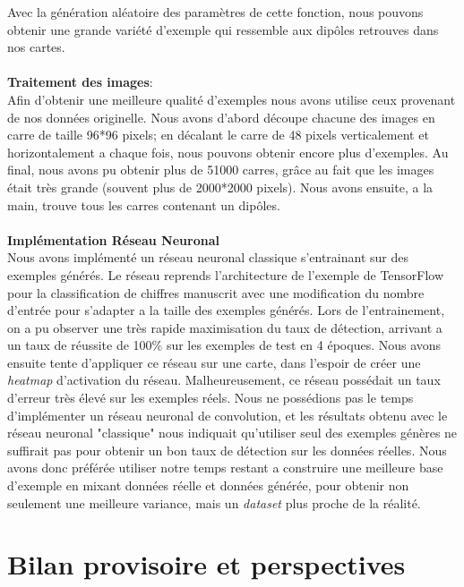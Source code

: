\documentclass[a4paper, 12pt, titlepage, oneside, french]{article}
\begin{document}
	Avec la génération aléatoire des paramètres de cette fonction, nous pouvons obtenir une grande variété d'exemple qui ressemble aux dipôles retrouves dans nos cartes.\\ \\ 
	\textbf{Traitement des images}:\\
	\indent Afin d'obtenir une meilleure qualité d'exemples nous avons utilise ceux provenant de nos données originelle. Nous avons d'abord découpe chacune des images en carre de taille 96*96 pixels; en décalant le carre de 48 pixels verticalement et horizontalement a chaque fois, nous pouvons obtenir encore plus d'exemples. Au final, nous avons pu obtenir plus de 51000 carres, grâce au fait que les images était très grande (souvent plus de 2000*2000 pixels). Nous avons ensuite, a la main, trouve tous les carres contenant un dipôles. %
	\\ \\
	\textbf{Implémentation Réseau Neuronal}\\
	\indent Nous avons implémenté un réseau neuronal classique s'entrainant sur des exemples générés. Le réseau reprends l'architecture de l'exemple de TensorFlow pour la classification de chiffres manuscrit avec une modification du nombre d'entrée pour s'adapter a la taille des exemples générés. Lors de l'entrainement, on a pu observer une très rapide maximisation du taux de détection, arrivant a un taux de réussite de 100\% sur les exemples de test en 4 époques. Nous avons ensuite tente d'appliquer ce réseau sur une carte, dans l'espoir de créer une \textit{heatmap} d'activation du réseau. Malheureusement, ce réseau possédait un taux d'erreur très élevé sur les exemples réels. Nous ne possédions pas le temps d'implémenter un réseau neuronal de convolution, et les résultats obtenu avec le réseau neuronal "classique" nous indiquait qu'utiliser seul des exemples génères ne suffirait pas pour obtenir un bon taux de détection sur les données réelles. Nous avons donc préférée utiliser notre temps restant a construire une meilleure base d'exemple en mixant données réelle et données générée, pour obtenir non seulement une meilleure variance, mais un \textit{dataset} plus proche de la réalité.
\newpage
\section{Bilan provisoire et perspectives}
\end{document}
